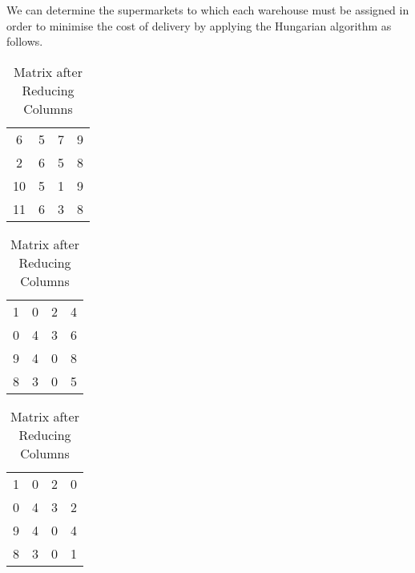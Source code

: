 \begin{subquestions}
\begin{subsubquestions}
We can determine the supermarkets to which each warehouse must be assigned in order to minimise the cost of delivery by applying the Hungarian algorithm as follows.
\begin{table}[H]
	\begin{minipage}{0.3\textwidth}
		\centering
		\begin{tabular}{cccc}
			6 & 5 & 7 & 9 \\
			2 & 6 & 5 & 8 \\
			10 & 5 & 1 & 9 \\
			11 & 6 & 3 & 8 \\
		\end{tabular}
		\captionsetup{width=1.1\linewidth}
		\caption*{Matrix From question}
	\end{minipage}
	\hspace{20pt}
	\begin{minipage}{0.3\textwidth}
		\centering
		\begin{tabular}{cccc}
			1 & 0 & 2 & 4 \\
			0 & 4 & 3 & 6 \\
			9 & 4 & 0 & 8 \\
			8 & 3 & 0 & 5 \\
		\end{tabular}
		\captionsetup{width=1.1\linewidth}
		\caption*{Matrix after Reducing Rows}
	\end{minipage}
	\hspace{20pt}
	\begin{minipage}{0.3\textwidth}
		\centering
		\begin{tabular}{cccc}
			1 & 0 & 2 & 0 \\
			0 & 4 & 3 & 2 \\
			9 & 4 & 0 & 4 \\
			8 & 3 & 0 & 1 \\
		\end{tabular}
		\captionsetup{width=1.1\linewidth}
		\caption*{Matrix after Reducing Columns} 
	\end{minipage}
	

\end{table}
\end{subsubquestions}
\end{subquestions}
